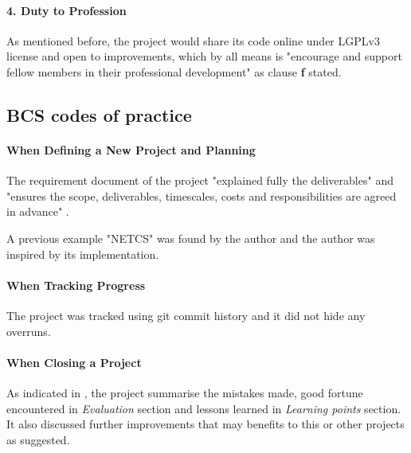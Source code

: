 \paragraph{4. Duty to Profession}
As mentioned before, the project would share its code online under LGPLv3 license and open to improvements, which by all means is
"encourage and support fellow members in their professional development" as clause \textbf{f} stated.

\subsection{BCS codes of practice \cite{bcspractic}}
\paragraph{When Defining a New Project and Planning}
The requirement document of the project "explained fully the deliverables"  and "ensures
the scope, deliverables, timescales, costs and responsibilities are agreed in advance" \cite{bcspractic}.
\par\noindent
A previous example "NETCS" \cite{DBLP:journals/corr/AmaxilatisLMS15} was found by the author and the author was inspired by its implementation.

\paragraph{When Tracking Progress}
The project was tracked using git commit history and it did not hide any overruns.

\paragraph{When Closing a Project}
As indicated in \cite{bcspractic}, the project summarise the mistakes made, good fortune encountered in \textit{Evaluation} section and
lessons learned in \textit{Learning points} section.
It also discussed further improvements that may benefits to this or other projects as suggested.
